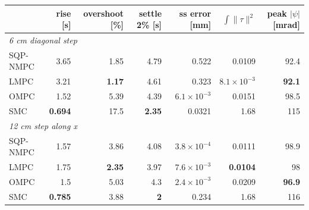 \begin{tabular}{lrrrrrr}
\toprule
 & rise [s] & overshoot [\%] & settle 2\% [s] & ss error [mm] & $\int\|\tau\|^2$ & peak $|\psi|$ [mrad] \\
\midrule
\multicolumn{7}{l}{\emph{6 cm diagonal step}} \\
SQP-NMPC & 3.65 & 1.85 & 4.79 & 0.522 & 0.0109 & 92.4 \\
LMPC & 3.21 & \textbf{1.17} & 4.61 & 0.323 & \textbf{$8.1\times10^{-3}$} & \textbf{92.1} \\
OMPC & 1.52 & 5.39 & 4.39 & \textbf{$6.1\times10^{-3}$} & 0.0151 & 98.5 \\
SMC & \textbf{0.694} & 17.5 & \textbf{2.35} & 0.0321 & 1.68 & 115 \\
\midrule
\multicolumn{7}{l}{\emph{12 cm step along x}} \\
SQP-NMPC & 1.57 & 3.86 & 4.08 & \textbf{$3.8\times10^{-4}$} & 0.0111 & 98.9 \\
LMPC & 1.75 & \textbf{2.35} & 3.97 & $7.6\times10^{-3}$ & \textbf{0.0104} & 98 \\
OMPC & 1.5 & 5.03 & 4.3 & $2.4\times10^{-3}$ & 0.0209 & \textbf{96.9} \\
SMC & \textbf{0.785} & 3.88 & \textbf{2} & 0.234 & 1.68 & 116 \\
\bottomrule
\end{tabular}
